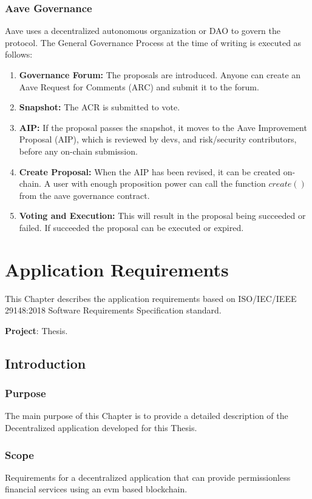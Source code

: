 \documentclass[11pt,a4paper]{report}
\begin{document}
\subsection{Aave Governance}\label{governance}
Aave\cite{aaveV1GOV} uses a decentralized autonomous organization or DAO\cite{wiki:Dao} to govern the protocol. The General Governance Process\cite{gov} at the time of writing is executed as follows:
\begin{enumerate}
	\item \textbf{Governance Forum\cite{govForum}:} The proposals are introduced. Anyone can create an Aave Request for Comments (ARC)\cite{arc} and submit it to the forum.
	\item \textbf{Snapshot\cite{snapshot}:} The ACR is submitted to vote.
	\item \textbf{AIP:} If the proposal passes the snapshot, it moves to the Aave Improvement Proposal (AIP), which is reviewed by devs, and risk/security contributors, before any on-chain submission.
	\item \textbf{Create Proposal:} When the AIP has been revised, it can be created on-chain. A user with enough proposition power can call the function $create()$\cite{create} from the aave governance contract.
	\item \textbf{Voting and Execution:} This will result in the proposal being succeeded or failed. If succeeded the proposal can be executed or expired.
\end{enumerate}

\chapter{Application Requirements} \label{ch:appreq}
This Chapter describes the application requirements based on ISO/IEC/IEEE 29148:2018\cite{iso} Software Requirements Specification standard.

\textbf{Project}: Thesis.
\section{Introduction}
\subsection{Purpose}
The main purpose of this Chapter is to provide a detailed description of the Decentralized application developed for this Thesis. 
\subsection{Scope}
Requirements for a decentralized application that can provide
permissionless financial services using an evm based blockchain.
\end{document}
